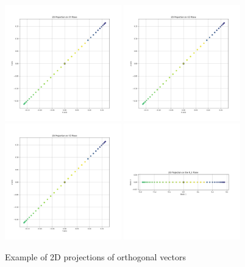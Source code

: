 \begin{figure}[H]
    \centering
    \includegraphics[width=0.45\textwidth]{figures/orthogonal_xy.png}
    \includegraphics[width=0.45\textwidth]{figures/orthogonal_xz.png}
    \includegraphics[width=0.45\textwidth]{figures/orthogonal_yz.png}
    \includegraphics[width=0.45\textwidth]{figures/orthogonal_r0.png}
    \caption{Example of 2D projections of orthogonal vectors}
    \label{fig:vis_2d_projections}
\end{figure}

